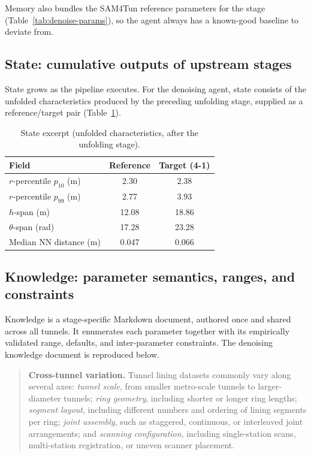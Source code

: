 \documentclass[a4paper,fleqn]{cas-dc}
\begin{document}
{Memory also bundles the SAM4Tun reference parameters for the stage (Table~\ref{tab:denoise-params}), so the agent always has a known-good baseline to deviate from.

\subsection{State: cumulative outputs of upstream stages}\label{app:context-state}
State grows as the pipeline executes. For the denoising agent, state consists of the unfolded characteristics produced by the preceding unfolding stage, supplied as a reference/target pair (Table~\ref{tab:context-state}).

\begin{table}[ht]
\caption{State excerpt (unfolded characteristics, after the unfolding stage).}\label{tab:context-state}
\begin{tabular*}{\tblwidth}{@{} l c c @{}}
\toprule
Field & Reference & Target (4-1) \\
\midrule
$r$-percentile $p_{10}$ (m) & 2.30 & 2.38 \\
$r$-percentile $p_{99}$ (m) & 2.77 & 3.93 \\
$h$-span (m) & 12.08 & 18.86 \\
$\theta$-span (rad) & 17.28 & 23.28 \\
Median NN distance (m) & 0.047 & 0.066 \\
\bottomrule
\end{tabular*}
\end{table}

\subsection{Knowledge: parameter semantics, ranges, and constraints}\label{app:context-knowledge}
Knowledge is a stage-specific Markdown document, authored once and shared across all tunnels. It enumerates each parameter together with its empirically validated range, defaults, and inter-parameter constraints. The denoising knowledge document is reproduced below.

\begin{quote}\small
\textbf{Cross-tunnel variation.}
Tunnel lining datasets commonly vary along several axes:
\textit{tunnel scale}, from smaller metro-scale tunnels to larger-diameter tunnels;
\textit{ring geometry}, including shorter or longer ring lengths;
\textit{segment layout}, including different numbers and ordering of lining segments per ring;
\textit{joint assembly}, such as staggered, continuous, or interleaved joint arrangements;
and \textit{scanning configuration}, including single-station scans, multi-station registration, or uneven scanner placement.


\end{quote}}
\end{document}

